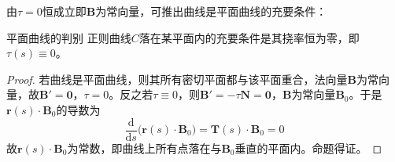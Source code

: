 由$\tau=0$恒成立即$\mathbf{B}$为常向量，可推出曲线是平面曲线的充要条件：

\begin{proposition}{平面曲线的判别}
	正则曲线$C$落在某平面内的充要条件是其挠率恒为零，即$\tau(s)\equiv 0$。
\end{proposition}

\begin{proof}
	若曲线是平面曲线，则其所有密切平面都与该平面重合，法向量$\mathbf{B}$为常向量，故$\mathbf{B}'=\mathbf{0}$，$\tau=0$。反之若$\tau\equiv 0$，则$\mathbf{B}'=-\tau\mathbf{N}=\mathbf{0}$，$\mathbf{B}$为常向量$\mathbf{B}_{0}$。于是$\mathbf{r}(s)\cdot\mathbf{B}_{0}$的导数为
	\begin{equation}
		\frac{\mathrm{d}}{\mathrm{d}s}\bigl(\mathbf{r}(s)\cdot\mathbf{B}_{0}\bigr)
		=\mathbf{T}(s)\cdot\mathbf{B}_{0}=0
	\end{equation}
	故$\mathbf{r}(s)\cdot\mathbf{B}_{0}$为常数，即曲线上所有点落在与$\mathbf{B}_{0}$垂直的平面内。命题得证。
\end{proof}
